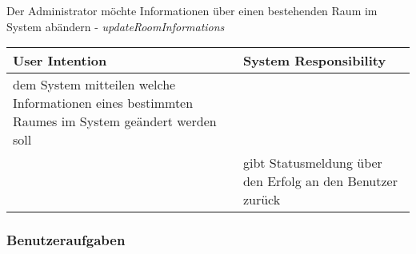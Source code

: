 \begin{table}[h]
	Der Administrator möchte Informationen über einen bestehenden Raum im System abändern - \textit{updateRoomInformations}\\
	\begin{tabularx}{\textwidth}{|X|X|}
	\rowcolor{heading} \textbf{User Intention} & \textbf{System Responsibility}\\ \hline
	dem System mitteilen welche Informationen eines bestimmten Raumes im System geändert werden soll & \\
	 & gibt Statusmeldung über den Erfolg an den Benutzer zurück \\ \hline
	\end{tabularx}
	
\end{table}


\subsubsection{Benutzeraufgaben}
